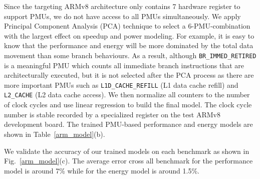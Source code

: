 Since the targeting ARMv8 architecture only contains 7 hardware register to support PMUs, we do not have access to all PMUs simultaneously. We apply Principal Component Analysis (PCA) technique \cite{witten2016data} to select a 6-PMU-combination with the largest effect on speedup and power modeling. For example, it is easy to know that the performance and energy will be more dominated by the total data movement than some branch behaviours. As a result, although \texttt{BR\_IMMED\_RETIRED} is a meaningful PMU which counts all immediate branch instructions that are architecturally executed, but it is not selected after the PCA process as there are more important PMUs such as \texttt{L1D\_CACHE\_REFILL} (L1 data cache refill) and \texttt{L2\_CACHE} (L2 data cache access). We then normalize all counters to the number of clock cycles and use linear regression to build the final model. The clock cycle number is stable recorded by a specialized register on the test ARMv8 development board. The trained PMU-based performance and energy models are shown in Table~\ref{arm_model}(b).

We validate the accuracy of our trained models on each benchmark as shown in Fig.~\ref{arm_model}(c). The average error cross all benchmark for the performance model is around 7\% while for the energy model is around 1.5\%.


